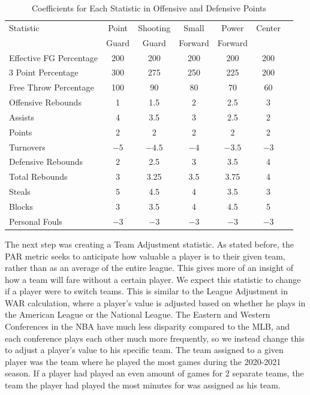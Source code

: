\documentclass[12pt]{article}
\begin{document}
\begin{table}[H]
  \caption{Coefficients for Each Statistic in Offensive and Defensive Points}
  \label{tab:Coefficientstable}
\centering
\begin{tabular}[t]{lcccccc}
  \toprule
  Statistic & Point & Shooting & Small & Power  & Center\\
  & Guard & Guard & Forward & Forward & \\
  \midrule
 Effective FG Percentage & 200 & 200 & 200 & 200 & 200\\
 3 Point Percentage & 300 & 275 & 250 & 225 & 200\\
 Free Throw Percentage & 100 & 90 & 80 & 70 & 60\\
 Offensive Rebounds & 1 & 1.5 & 2 & 2.5 & 3\\
 Assists & 4 & 3.5 & 3 & 2.5 & 2\\
 Points & 2 & 2 & 2 & 2 & 2\\
 Turnovers & $-5$ & $-4.5$ & $-4$ & $-3.5$ & $-3$\\
 Defensive Rebounds & 2 & 2.5 & 3 & 3.5 & 4\\
 Total Rebounds & 3 & 3.25 & 3.5 & 3.75 & 4\\
 Steals & 5 & 4.5 & 4 & 3.5 & 3\\
 Blocks & 3 & 3.5 & 4 & 4.5 & 5\\
 Personal Fouls & $-3$ & $-3$ & $-3$ & $-3$ & $-3$\\
  \bottomrule
\end{tabular}
\end{table}

The next step was creating a Team Adjustment statistic. As stated before, 
the PAR metric seeks to 
anticipate how valuable a player is to their given team, rather than as an 
average of the entire league. This 
gives more of an insight of how a team will fare without a certain player. 
We expect this statistic to change if 
a player were to switch teams. This is similar to the League Adjustment in 
WAR calculation, where a 
player's value is adjusted based on whether he plays in the American 
League or the National League. The 
Eastern and Western Conferences in the NBA have much less disparity 
compared to the MLB, and each 
conference plays each other much more frequently, so we instead change 
this to adjust a player's value to 
his specific team. The team assigned to a given player was the team 
where he played the most games 
during the 2020-2021 season. If a player had played an even amount of 
games for 2 separate teams, the 
team the player had played the most minutes for was assigned as his 
team. 
\end{document}
